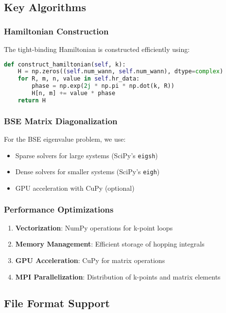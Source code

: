 \documentclass[11pt,a4paper]{article}
\newcommand{\code}[1]{\texttt{#1}}
\begin{document}
\subsection{Key Algorithms}

\subsubsection{Hamiltonian Construction}

The tight-binding Hamiltonian is constructed efficiently using:

\begin{lstlisting}[language=Python]
def construct_hamiltonian(self, k):
    H = np.zeros((self.num_wann, self.num_wann), dtype=complex)
    for R, m, n, value in self.hr_data:
        phase = np.exp(2j * np.pi * np.dot(k, R))
        H[n, m] += value * phase
    return H
\end{lstlisting}

\subsubsection{BSE Matrix Diagonalization}

For the BSE eigenvalue problem, we use:
\begin{itemize}
    \item Sparse solvers for large systems (SciPy's \code{eigsh})
    \item Dense solvers for smaller systems (SciPy's \code{eigh})
    \item GPU acceleration with CuPy (optional)
\end{itemize}

\subsubsection{Performance Optimizations}

\begin{enumerate}
    \item \textbf{Vectorization}: NumPy operations for k-point loops
    \item \textbf{Memory Management}: Efficient storage of hopping integrals
    \item \textbf{GPU Acceleration}: CuPy for matrix operations
    \item \textbf{MPI Parallelization}: Distribution of k-points and matrix elements
\end{enumerate}

\subsection{File Format Support}
\end{document}
